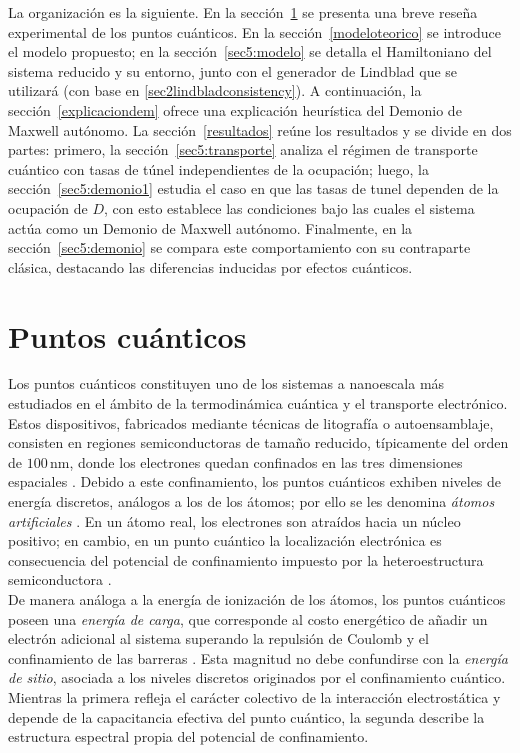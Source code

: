 La organización es la siguiente. En la sección~\ref{puntoscuanticos} se presenta una breve reseña experimental de los puntos cuánticos. En la sección~\ref{modeloteorico} se introduce el modelo propuesto; en la sección~\ref{sec5:modelo} se detalla el Hamiltoniano del sistema reducido y su entorno, junto con el generador de Lindblad que se utilizará (con base en \ref{sec2lindbladconsistency}). A continuación, la sección~\ref{explicaciondem} ofrece una explicación heurística del Demonio de Maxwell autónomo. La sección~\ref{resultados} reúne los resultados y se divide en dos partes: primero, la sección~\ref{sec5:transporte} analiza el régimen de transporte cuántico con tasas de túnel independientes de la ocupación; luego, la sección~\ref{sec5:demonio1} estudia el caso en que las tasas de tunel dependen de la ocupación de $D$, con esto establece las condiciones bajo las cuales el sistema actúa como un Demonio de Maxwell autónomo. Finalmente, en la sección~\ref{sec5:demonio} se compara este comportamiento con su contraparte clásica, destacando las diferencias inducidas por efectos cuánticos.

\section{Puntos cuánticos}
\label{puntoscuanticos}
Los puntos cuánticos constituyen uno de los sistemas a nanoescala más estudiados en el ámbito de la termodinámica cuántica y el transporte electrónico. Estos dispositivos, fabricados mediante técnicas de litografía o autoensamblaje, consisten en regiones semiconductoras de tamaño reducido, típicamente del orden de $100\,\text{nm}$, donde los electrones quedan confinados en las tres dimensiones espaciales \cite{hanson2007spins}. Debido a este confinamiento, los puntos cuánticos exhiben niveles de energía discretos, análogos a los de los átomos; por ello se les denomina \textit{átomos artificiales} \cite{kouwenhoven2001few}. En un átomo real, los electrones son atraídos hacia un núcleo positivo; en cambio, en un punto cuántico la localización electrónica es consecuencia del potencial de confinamiento impuesto por la heteroestructura semiconductora \cite{ashoori1996electrons}. 
\\

De manera análoga a la energía de ionización de los átomos, los puntos cuánticos poseen una \textit{energía de carga}, que corresponde al costo energético de añadir un electrón adicional al sistema superando la repulsión de Coulomb y el confinamiento de las barreras \cite{hanson2007spins}. Esta magnitud no debe confundirse con la \textit{energía de sitio}, asociada a los niveles discretos originados por el confinamiento cuántico. Mientras la primera refleja el carácter colectivo de la interacción electrostática y depende de la capacitancia efectiva del punto cuántico, la segunda describe la estructura espectral propia del potencial de confinamiento. 
\\

